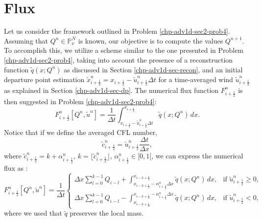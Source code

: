 \section{Flux}
\label{chp-adv1d-sec-flux}
Let us consider the framework outlined in Problem \ref{chp-adv1d-sec2-prob4}.
Assuming that $Q^{n} \in \mathbb{P}^{N}_{\nu}$ is known, our objective is to compute the values $Q^{n+1}$.
To accomplish this, we utilize a scheme similar to the one presented in Problem \ref{chp-adv1d-sec2-prob4},
taking into account the presence of a reconstruction function $\tilde{q}(x;Q^n)$ as discussed in Section
\ref{chp-adv1d-sec-recon}, and an initial departure point estimation
$\tilde{x}_{i+\frac{1}{2}}^n = {x}_{i+\frac{1}{2}} -\tilde{u}_{i+\frac{1}{2}}^n \Delta t$
for a time-averaged wind $\tilde{u}_{i+\frac{1}{2}}^n$ as explained in Section \ref{chp-adv1d-sec-dp}.
The numerical flux function ${F}^{n}_{i+\frac{1}{2}}$ is then suggested in Problem \ref{chp-adv1d-sec2-prob4}:
\begin{equation}
	\label{chp-sec-flux:numerical-flux1}
	{F}^{n}_{i+\frac{1}{2}}[Q^n,\tilde{u}^n]  = \frac{1}{\Delta t}
	\int_{x_{i+\frac{1}{2}}-\tilde{u}^n_{i+\frac{1}{2}}\Delta t}^{x_{i+\frac{1}{2}}}
	\tilde{q}(x;Q^n) \,dx.
\end{equation}
Notice that if we define the averaged CFL number,
\begin{equation*}
	\label{chp-sec-flux:cedges}
	\tilde{c}_{i+\frac{1}{2}}^n = \tilde{u}_{i+\frac{1}{2}}^n\frac{\Delta t}{\Delta x},
\end{equation*}
where $\tilde{c}_{i+\frac{1}{2}}^n = k + \alpha_{i+\frac{1}{2}}^n$, $k = \lfloor \tilde{c}_{i+\frac{1}{2}}^n \rfloor$,
$\alpha_{i+\frac{1}{2}}^n \in [0,1[$,
we can express the numerical flux as \citep{lin:1996, chen:2017}:
\begin{equation}
	\label{chp-sec-flux:numerical-flux}
	{F}_{i+\frac{1}{2}}^n[Q^n,\tilde{u}^n] =  \frac{1}{\Delta t}
	\begin{cases}
	\Delta x\sum_{l=0}^{k-1} Q_{i-l} +  
    \int_{x_{i-k+\frac{1}{2}}-{\alpha}^n_{i+\frac{1}{2}}\Delta x}^{x_{i-k+\frac{1}{2}}}
    \tilde{q}(x;Q^n) \,dx, & \text{if } \tilde{u}_{i+\frac{1}{2}}^n \geq 0,\\
	\Delta x\sum_{l=0}^{k-1} Q_{i-l} -  
    \int^{x_{i-k+\frac{1}{2}}-{\alpha}^n_{i+\frac{1}{2}}\Delta x}_{x_{i-k+\frac{1}{2}}}
    \tilde{q}(x;Q^n) \,dx, & \text{if } \tilde{u}_{i+\frac{1}{2}}^n < 0,
	\end{cases}
\end{equation}
where we used that $\tilde{q}$ preserves the local mass.


